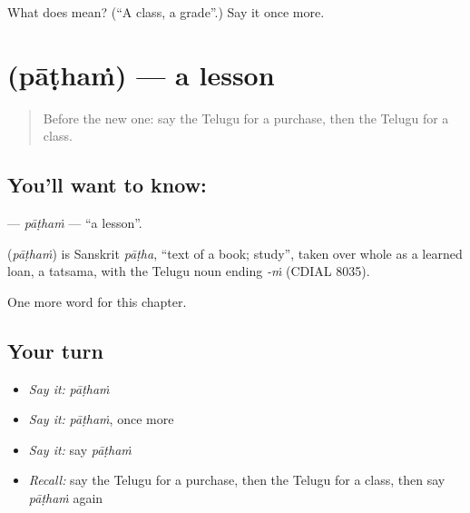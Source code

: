 \begin{tcolorbox}[breakable,colback=teal!4,colframe=teal!35!black,title={Before you move on}]
What does  mean? (\textquotedblleft{}A class, a grade\textquotedblright{}.) Say it once more.
\end{tcolorbox}
\section[\texorpdfstring{\te{పాఠం} (pāṭhaṁ)}{పాఠం (pāṭhaṁ)}]{ (pāṭhaṁ) — a lesson}

\label{lesson:TE-C274-patham}



\begin{quote}
Before the new one: say the Telugu for a purchase, then the Telugu for a class.
\end{quote}

\subsection*{You'll want to know: }
\textbf{} — \emph{pāṭhaṁ} — \textquotedblleft{}a lesson\textquotedblright{}.

\begin{cousinweb}
\textbf{} (\emph{pāṭhaṁ}) is Sanskrit \emph{pāṭha}, \textquotedblleft{}text of a book; study\textquotedblright{}, taken over whole as a learned loan, a tatsama, with the Telugu noun ending \emph{-ṁ} (CDIAL 8035).
\end{cousinweb}

\begin{grammarlens}[title={What you've built}]
One more word for this chapter.
\end{grammarlens}

\subsection*{Your turn}
\begin{itemize}
\raggedright
  \item \emph{Say it:} \emph{pāṭhaṁ}
  \item \emph{Say it:} \emph{pāṭhaṁ}, once more
  \item \emph{Say it:} say \emph{pāṭhaṁ}
  \item \emph{Recall:} say the Telugu for a purchase, then the Telugu for a class, then say \emph{pāṭhaṁ} again
\end{itemize}

